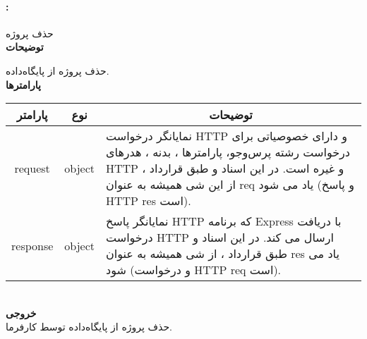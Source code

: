 \paragraph{:}
حذف پروژه‌ 
\\
\textbf{توضیحات}
\hr
\begin{flushleft}
	\framebox[.9\textwidth][l]{
		\lr{
			\textcolor{type}{void}
			\textcolor{func}{getDeleteProject}
			\textcolor{symb}{(}
			\textcolor{type}{object}
			\textcolor{arg}{request}
			\textcolor{symb}{,}
			\textcolor{type}{object}
			\textcolor{arg}{response}
			\textcolor{symb}{);}
		}
	}
\end{flushleft}
حذف پروژه از پایگاه‌داده.
\\
\textbf{پارامترها}
\hr \\[10pt]
\begin{tabular}{|m{4cm}|m{3cm}|m{10cm}|}
	\hline
	\multicolumn{1}{|c}{پارامتر}
	&
	\multicolumn{1}{|c}{نوع}
	&
	\multicolumn{1}{|c|}{توضیحات}
	\\
	\hline
	\multicolumn{1}{|c}{request}
	&
	\multicolumn{1}{|c|}{object}
	&
	نمایانگر درخواست HTTP و دارای خصوصیاتی برای درخواست رشته پرس‌و‌جو، پارامترها ، بدنه ، هدرهای HTTP و غیره است.
	در این اسناد و طبق قرارداد ، از این شی همیشه به عنوان req یاد می شود (و پاسخ HTTP res است).
	\\
	\hline
	\multicolumn{1}{|c}{response}
	&
	\multicolumn{1}{|c|}{object}
	&
	نمایانگر پاسخ HTTP که برنامه Express با دریافت درخواست HTTP ارسال می کند.
	در این اسناد و طبق قرارداد ، از شی همیشه به عنوان res یاد می شود (و درخواست HTTP req است).
	\\
	\hline
\end{tabular}
\\[10pt]
\textbf{خروجی}
\hr \\
حذف پروژه از پایگاه‌داده توسط کارفرما.

